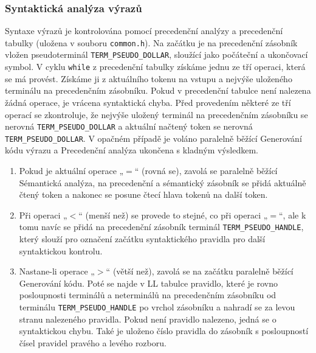 \documentclass[a4paper, 12pt]{article}
\begin{document}
\subsubsection{Syntaktická analýza výrazů}
Syntaxe výrazů je kontrolována pomocí precedenční analýzy a precedenční tabulky (uložena v souboru \verb|common.h|). Na začátku je na precedenční zásobník vložen pseudoterminál \linebreak \verb|TERM_PSEUDO_DOLLAR|, sloužící jako počáteční a ukončovací symbol. V cyklu \verb|while| z precedenční tabulky získáme jednu ze tří operaci, která se má provést. Získáme ji z aktuálního tokenu na vstupu a nejvýše uloženého terminálu na precedenčním zásobníku. Pokud v precedenční tabulce není nalezena žádná operace, je vrácena syntaktická chyba. Před provedením některé ze tří operací se zkontroluje, že nejvýše uložený terminál na precedenčním zásobníku se nerovná \verb|TERM_PSEUDO_DOLLAR| a aktuální načtený token se nerovná \verb|TERM_PSEUDO_DOLLAR|. V opačném případě je voláno paralelně běžící Generování kódu výrazu a Precedenční analýza ukončena s kladným výsledkem.
\begin{enumerate}
    \item Pokud je aktuální operace „$=$“ (rovná se), zavolá se paralelně běžící Sémantická analýza, na precedenční a sémantický zásobník se přidá aktuálně čtený token a nakonec se posune čtecí hlava tokenů na další token.
    \item Při operaci „$<$“ (menší než) se provede to stejné, co při operaci „$=$“, ale k tomu navíc se přidá na precedenční zásobník terminál \verb|TERM_PSEUDO_HANDLE|, který slouží pro označení začátku syntaktického pravidla pro další syntaktickou kontrolu.
    \item Nastane-li operace „$>$“ (větší než), zavolá se na začátku paralelně běžící Generování kódu.  Poté se najde v LL tabulce pravidlo, které je rovno posloupnosti terminálů a neterminálů na precedenčním zásobníku od terminálu \verb|TERM_PSEUDO_HANDLE| po vrchol zásobníku a nahradí se za levou stranu nalezeného pravidla. Pokud není pravidlo nalezeno, jedná se o syntaktickou chybu. Také je uloženo číslo pravidla do zásobník s posloupností čísel pravidel pravého a levého rozboru.
\end{enumerate}

\newpage

\end{document}
